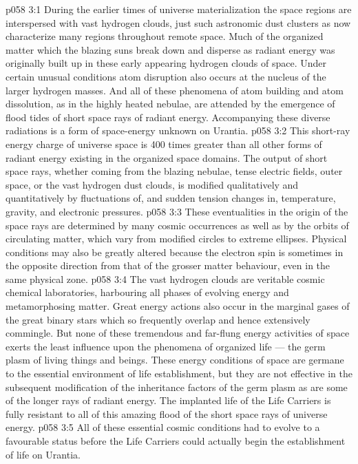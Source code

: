 \vs p058 3:1 During the earlier times of universe materialization the space regions are interspersed with vast hydrogen clouds, just such astronomic dust clusters as now characterize many regions throughout remote space. Much of the organized matter which the blazing suns break down and disperse as radiant energy was originally built up in these early appearing hydrogen clouds of space. Under certain unusual conditions atom disruption also occurs at the nucleus of the larger hydrogen masses. And all of these phenomena of atom building and atom dissolution, as in the highly heated nebulae, are attended by the emergence of flood tides of short space rays of radiant energy. Accompanying these diverse radiations is a form of space\hyp{}energy unknown on Urantia.
\vs p058 3:2 This short\hyp{}ray energy charge of universe space is 400 times greater than all other forms of radiant energy existing in the organized space domains. The output of short space rays, whether coming from the blazing nebulae, tense electric fields, outer space, or the vast hydrogen dust clouds, is modified qualitatively and quantitatively by fluctuations of, and sudden tension changes in, temperature, gravity, and electronic pressures.
\vs p058 3:3 These eventualities in the origin of the space rays are determined by many cosmic occurrences as well as by the orbits of circulating matter, which vary from modified circles to extreme ellipses. Physical conditions may also be greatly altered because the electron spin is sometimes in the opposite direction from that of the grosser matter behaviour, even in the same physical zone.
\vs p058 3:4 The vast hydrogen clouds are veritable cosmic chemical laboratories, harbouring all phases of evolving energy and metamorphosing matter. Great energy actions also occur in the marginal gases of the great binary stars which so frequently overlap and hence extensively commingle. But none of these tremendous and far\hyp{}flung energy activities of space exerts the least influence upon the phenomena of organized life --- the germ plasm of living things and beings. These energy conditions of space are germane to the essential environment of life establishment, but they are not effective in the subsequent modification of the inheritance factors of the germ plasm as are some of the longer rays of radiant energy. The implanted life of the Life Carriers is fully resistant to all of this amazing flood of the short space rays of universe energy.
\vs p058 3:5 \pc All of these essential cosmic conditions had to evolve to a favourable status before the Life Carriers could actually begin the establishment of life on Urantia.
